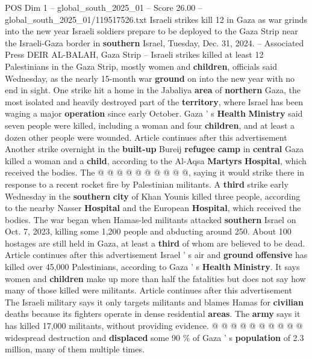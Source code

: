 \begin{textsample}{POS Dim 1 – global\_south\_2025\_01 – Score 26.00 – global\_south\_2025\_01/119517526.txt}  \label{ex:f1_pos_300}
Israeli strikes kill 12 in Gaza as war grinds into the new year Israeli soldiers prepare to be deployed to the Gaza Strip near the Israeli-Gaza border in \textbf{southern} Israel, Tuesday, Dec. 31, 2024. -- Associated Press DEIR AL-BALAH, Gaza Strip -- Israeli strikes killed at least 12 Palestinians in the Gaza Strip, mostly women and \textbf{children}, officials said Wednesday, as the nearly 15-month war \textbf{ground} on into the new year with no end in sight.
One strike hit a home in the Jabaliya \textbf{area} of \textbf{northern} Gaza, the most isolated and heavily destroyed part of the \textbf{territory}, where Israel has been waging a major \textbf{operation} since early October.
Gaza ' s \textbf{Health} \textbf{Ministry} said seven people were killed, including a woman and four \textbf{children}, and at least a dozen other people were wounded.
Article continues after this advertisement Another strike overnight in the \textbf{built-up} Bureij \textbf{refugee} \textbf{camp} in \textbf{central} Gaza killed a woman and a \textbf{child}, according to the Al-Aqsa \textbf{Martyrs} \textbf{Hospital}, which received the bodies.
The @ @ @ @ @ @ @ @ @ @, saying it would strike there in response to a recent rocket fire by Palestinian militants.
A \textbf{third} strike early Wednesday in the \textbf{southern} \textbf{city} of Khan Younis killed three people, according to the nearby Nasser \textbf{Hospital} and the European \textbf{Hospital}, which received the bodies.
The war began when Hamas-led militants attacked \textbf{southern} Israel on Oct. 7, 2023, killing some 1,200 people and abducting around 250.
About 100 hostages are still held in Gaza, at least a \textbf{third} of whom are believed to be dead.
Article continues after this advertisement Israel ' s air and \textbf{ground} \textbf{offensive} has killed over 45,000 Palestinians, according to Gaza ' s \textbf{Health} \textbf{Ministry}.
It says women and \textbf{children} make up more than half the fatalities but does not say how many of those killed were militants.
Article continues after this advertisement The Israeli military says it only targets militants and blames Hamas for \textbf{civilian} deaths because its fighters operate in dense residential \textbf{areas}.
The \textbf{army} says it has killed 17,000 militants, without providing evidence. @ @ @ @ @ @ @ @ @ @ widespread destruction and \textbf{displaced} some 90 \% of Gaza ' s \textbf{population} of 2.3 million, many of them multiple times.

\end{textsample}
